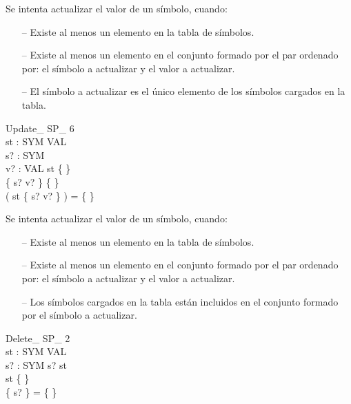 \begin{tcolorbox}[colback=gray!5!white,colframe=gray!50!black,
  colbacktitle=gray!75!black,title=Update\_ SP\_ 5]
  Se intenta actualizar el valor de un símbolo, cuando:
     \begin{itemize}
        \item[--]{Existe al menos un elemento en la tabla de símbolos.}
        \item[--]{Existe al menos un elemento en el conjunto formado por el par ordenado por: el símbolo a actualizar y el valor a actualizar.}
        \item[--]{El símbolo a actualizar es el único elemento de los símbolos cargados en la tabla.}
     \end{itemize}
\end{tcolorbox}


\begin{schema}{Update\_ SP\_ 6}\\
 st : SYM \pfun VAL \\
 s? : SYM \\
 v? : VAL 
\where
 st \neq \{ \} \\
 \{ s? \mapsto v? \} \neq \{ \} \\
 ( \dom st \cap \dom \{ s? \mapsto v? \} ) = \{ \}
\end{schema}

\begin{tcolorbox}[colback=gray!5!white,colframe=gray!50!black,
  colbacktitle=gray!75!black,title=Update\_ SP\_ 6]
  Se intenta actualizar el valor de un símbolo, cuando:
     \begin{itemize}
        \item[--]{Existe al menos un elemento en la tabla de símbolos.}
        \item[--]{Existe al menos un elemento en el conjunto formado por el par ordenado por: el símbolo a actualizar y el valor a actualizar.}
        \item[--]{Los símbolos cargados en la tabla están incluidos en el conjunto formado por el símbolo a actualizar.}
     \end{itemize}
\end{tcolorbox}


\begin{schema}{Delete\_ SP\_ 2}\\
 st : SYM \pfun VAL \\
 s? : SYM 
\where
 s? \in \dom st \\
 st \neq \{ \} \\
 \{ s? \} = \{ \}
\end{schema}

